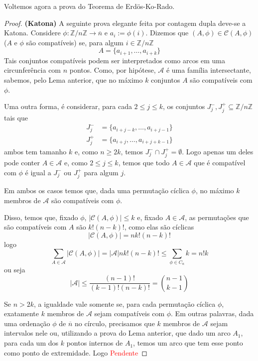 \documentclass[11pt]{article}
\newcommand{\mc}[1]{\mathcal{#1}}
\newcommand{\mbb}[1]{\mathbb{#1}}
\newcommand{\ol}[1]{\overline{#1}}
\begin{document}
Voltemos agora a prova do Teorema de Erdös-Ko-Rado.

\begin{proof}\textbf{(Katona)}
    A seguinte prova elegante feita por contagem dupla deve-se a Katona. Considere $\phi:\mbb{Z}/n\mbb{Z}\to\ol{n}$ e $a_i:=\phi(i)$. Dizemos que $(A,\phi)\in\mc{C}(A,\phi)$ ($A$ e $\phi$ são compatíveis) se, para algum $i\in\mbb{Z}/n\mbb{Z}$
    $$A=\{a_{i+1},\dots,a_{i+k}\}$$
    Tais conjuntos compatíveis podem ser interpretados como arcos em uma circunferência com $n$ pontos. Como, por hipótese, $\mathscr{A}$ é uma família intersectante, sabemos, pelo Lema anterior, que no máximo $k$ conjuntos $A$ são compatíveis com $\phi$.

    Uma outra forma, é considerar, para cada $2\leq j\leq k$, os conjuntos $J_j^-,J_j^+\subseteq\mbb{Z}/n\mbb{Z}$ tais que
    \begin{align*}
        J_j^- & = \{a_{i+j-k}, \dots, a_{i+j-1}\}\\
        J_j^+ & = \{a_{i+j}, \dots, a_{i+j+k-1}\}
    \end{align*}
    ambos tem tamanho $k$ e, como $n\geq2k$, temos $J_j^-\cap J_j^+=\emptyset$. Logo apenas um deles pode conter $A\in\mathscr{A}$ e, como $2\leq j\leq k$, temos que todo $A\in\mathscr{A}$ que é compatível com $\phi$ é igual a $J_j^-$ ou $J_j^+$ para algum $j$.
    
    Em ambos os casos temos que, dada uma permutação cíclica $\phi$, no máximo $k$ membros de $\mathscr{A}$ são compatíveis com $\phi$.
    
    Disso, temos que, fixado $\phi$, $|\mc{C}(A,\phi)|\leq k$ e, fixado $A\in\mathscr{A}$, as permutações que são compatíveis com $A$ são $k!(n-k)!$, como elas são cíclicas
    $$|\mc{C}(A,\phi)|=nk!(n-k)!$$
    logo
    $$\sum_{A\in\mathscr{A}}|\mc{C}(A,\phi)|=|\mathscr{A}|nk!(n-k)!\leq\sum_{\phi\in C_n}k=n!k$$
    ou seja
    $$|\mathscr{A}|\leq\frac{(n-1)!}{(k-1)!(n-k)!}=\binom{n-1}{k-1}$$

    Se $n>2k$, a igualdade vale somente se, para cada permutação cíclica $\phi$, exatamente $k$ membros de $\mathscr{A}$ sejam compatíveis com $\phi$. Em outras palavras, dada uma ordenação $\phi$ de $\ol{n}$ no círculo, precisamos que $k$ membros de $\mathscr{A}$ sejam intervalos nele ou, utilizando a prova do Lema anterior, que dado um arco $A_1$, para cada um dos $k$ pontos internos de $A_1$, temos um arco que tem esse ponto como ponto de extremidade. Logo \textcolor{red}{Pendente}
\end{proof}
\end{document}
